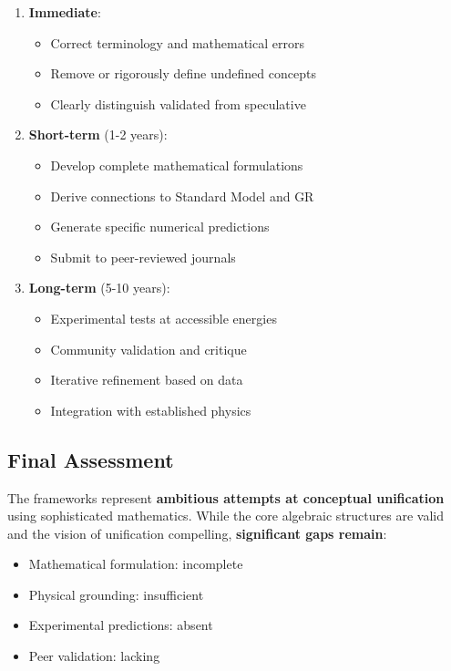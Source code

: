 \begin{enumerate}
    \item \textbf{Immediate}:
    \begin{itemize}
        \item Correct terminology and mathematical errors
        \item Remove or rigorously define undefined concepts
        \item Clearly distinguish validated from speculative
    \end{itemize}

    \item \textbf{Short-term} (1-2 years):
    \begin{itemize}
        \item Develop complete mathematical formulations
        \item Derive connections to Standard Model and GR
        \item Generate specific numerical predictions
        \item Submit to peer-reviewed journals
    \end{itemize}

    \item \textbf{Long-term} (5-10 years):
    \begin{itemize}
        \item Experimental tests at accessible energies
        \item Community validation and critique
        \item Iterative refinement based on data
        \item Integration with established physics
    \end{itemize}
\end{enumerate}

\subsection{Final Assessment}

The frameworks represent \textbf{ambitious attempts at conceptual unification} using sophisticated mathematics. While the core algebraic structures are valid and the vision of unification compelling, \textbf{significant gaps remain}:

\begin{itemize}
    \item Mathematical formulation: incomplete
    \item Physical grounding: insufficient
    \item Experimental predictions: absent
    \item Peer validation: lacking
\end{itemize}

